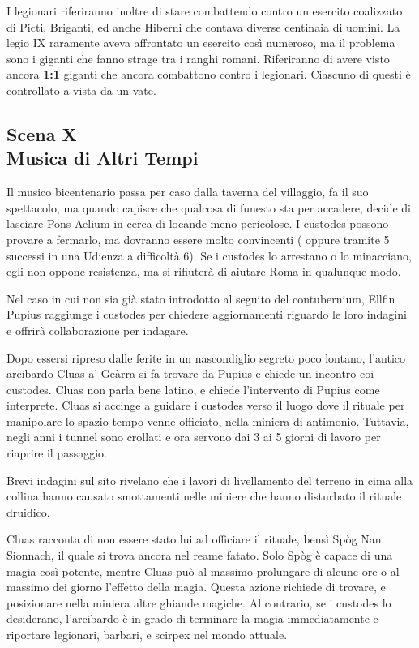 \documentclass[11.5pt,twocolumn]{article}
\begin{document}

I legionari riferiranno inoltre di stare combattendo contro un esercito coalizzato di Picti, Briganti, ed anche Hiberni che contava diverse centinaia di uomini.
La legio IX raramente aveva affrontato un esercito cos\`{i} numeroso, ma il problema sono i giganti che fanno strage tra i ranghi romani.
Riferiranno di avere visto ancora \textbf{1:1} giganti che ancora combattono contro i legionari.
Ciascuno di questi \`{e} controllato a vista da un vate.

\subsection*{Scena X\\Musica di Altri Tempi}
%
Il musico bicentenario passa per caso dalla taverna del villaggio, fa il suo spettacolo, ma quando capisce che qualcosa di funesto sta per accadere, decide di lasciare Pons Aelium in cerca di locande meno pericolose.
I custodes possono provare a fermarlo, ma dovranno essere molto convincenti ( oppure tramite 5 successi in una Udienza a difficolt\`{a} 6).
Se i custodes lo arrestano o lo minacciano, egli non oppone resistenza, ma si rifiuter\`{a} di aiutare Roma in qualunque modo.

Nel caso in cui non sia gi\`{a} stato introdotto al seguito del contubernium, Ellfin Pupius raggiunge i custodes per chiedere aggiornamenti riguardo le loro indagini e offrir\`{a} collaborazione per indagare.

Dopo essersi ripreso dalle ferite in un nascondiglio segreto poco lontano, l'antico arcibardo Cluas a' Ge\`{a}rra si fa trovare da Pupius e chiede un incontro coi custodes.
Cluas non parla bene latino, e chiede l'intervento di Pupius come interprete.
Cluas si accinge a guidare i custodes verso il luogo dove il rituale per manipolare lo spazio-tempo venne officiato, nella miniera di antimonio.
Tuttavia, negli anni i tunnel sono crollati e ora servono dai 3 ai 5 giorni di lavoro per riaprire il passaggio.

Brevi indagini sul sito rivelano che i lavori di livellamento del terreno in cima alla collina hanno causato smottamenti nelle miniere che hanno disturbato il rituale druidico.

Cluas racconta di non essere stato lui ad officiare il rituale, bens\`{i} Sp\`{o}g Nan Sionnach, il quale si trova ancora nel reame fatato.
Solo Sp\`{o}g \`{e} capace di una magia cos\`{i} potente, mentre Cluas pu\`{o} al massimo prolungare di alcune ore o al massimo dei giorno l'effetto della magia.
Questa azione richiede di trovare, e posizionare nella miniera altre ghiande magiche.
Al contrario, se i custodes lo desiderano, l'arcibardo \`{e} in grado di terminare la magia immediatamente e riportare legionari, barbari, e scirpex nel mondo attuale.
\end{document}
